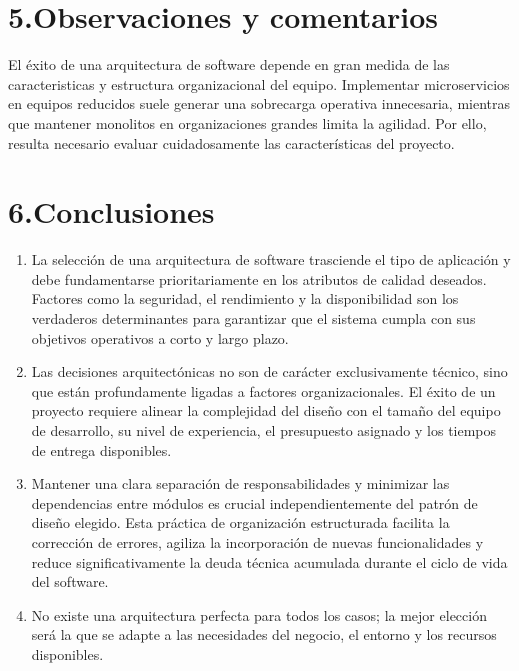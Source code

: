 \documentclass[12pt,letterpaper]{article}
\begin{document}
\vspace{1em}

\section*{5.Observaciones y comentarios}
El éxito de una arquitectura de software depende en gran medida de las caracteristicas y estructura organizacional del equipo. Implementar microservicios en equipos reducidos suele generar una sobrecarga operativa innecesaria, mientras que mantener monolitos en organizaciones grandes limita la agilidad. Por ello, resulta necesario evaluar cuidadosamente las características del proyecto.


\vspace{1em}

\section*{6.Conclusiones}
\begin{enumerate}
    \item La selección de una arquitectura de software trasciende el tipo de aplicación y debe fundamentarse prioritariamente en los atributos de calidad deseados. Factores como la seguridad, el rendimiento y la disponibilidad son los verdaderos determinantes para garantizar que el sistema cumpla con sus objetivos operativos a corto y largo plazo.
    
    \item Las decisiones arquitectónicas no son de carácter exclusivamente técnico, sino que están profundamente ligadas a factores organizacionales. El éxito de un proyecto requiere alinear la complejidad del diseño con el tamaño del equipo de desarrollo, su nivel de experiencia, el presupuesto asignado y los tiempos de entrega disponibles.
    
    \item Mantener una clara separación de responsabilidades y minimizar las dependencias entre módulos es crucial independientemente del patrón de diseño elegido. Esta práctica de organización estructurada facilita la corrección de errores, agiliza la incorporación de nuevas funcionalidades y reduce significativamente la deuda técnica acumulada durante el ciclo de vida del software.
    
    \item No existe una arquitectura perfecta para todos los casos; la mejor elección será la que se adapte a las necesidades del negocio, el entorno y los recursos disponibles.
\end{enumerate}
\vspace{1em}
\end{document}
